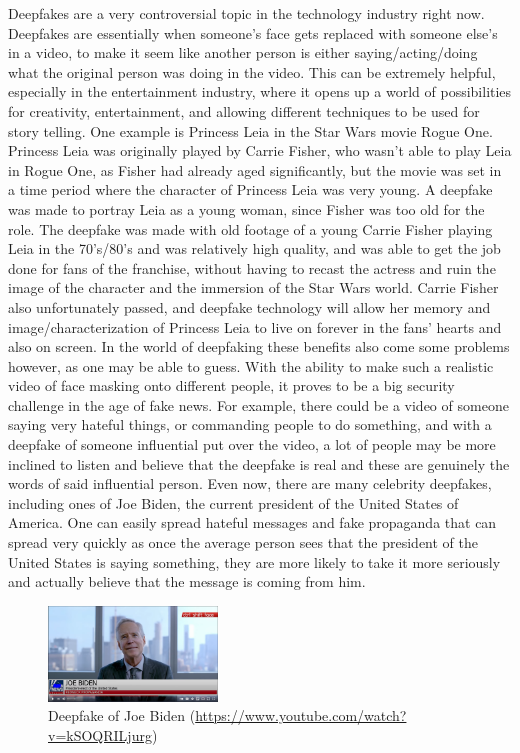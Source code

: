 \documentclass{article}
\begin{document}
Deepfakes are a very controversial topic in the technology industry right now. Deepfakes are essentially when someone’s face gets replaced with someone else’s in a video, to make it seem like another person is either saying/acting/doing what the original person was doing in the video. This can be extremely helpful, especially in the entertainment industry, where it opens up a world of possibilities for creativity, entertainment, and allowing different techniques to be used for story telling. One example is Princess Leia in the Star Wars movie Rogue One. Princess Leia was originally played by Carrie Fisher, who wasn’t able to play Leia in Rogue One, as Fisher had already aged significantly, but the movie was set in a time period where the character of Princess Leia was very young. A deepfake was made to portray Leia as a young woman, since Fisher was too old for the role. The deepfake was made with old footage of a young Carrie Fisher playing Leia in the 70’s/80’s and was relatively high quality, and was able to get the job done for fans of the franchise, without having to recast the actress and ruin the image of the character and the immersion of the Star Wars world. Carrie Fisher also unfortunately passed, and deepfake technology will allow her memory and image/characterization of Princess Leia to live on forever in the fans’ hearts and also on screen. In the world of deepfaking these benefits also come some problems however, as one may be able to guess. With the ability to make such a realistic video of face masking onto different people, it proves to be a big security challenge in the age of fake news. For example, there could be a video of someone saying very hateful things, or commanding people to do something, and with a deepfake of someone influential put over the video, a lot of people may be more inclined to listen and believe that the deepfake is real and these are genuinely the words of said influential person. Even now, there are many celebrity deepfakes, including ones of Joe Biden, the current president of the United States of America. One can easily spread hateful messages and fake propaganda that can spread very quickly as once the average person sees that the president of the United States is saying something, they are more likely to take it more seriously and actually believe that the message is coming from him. 

\begin{figure}[!htbp]
\caption{Deepfake of Joe Biden (\url{https://www.youtube.com/watch?v=kSOQRILjurg})}
\centering
\includegraphics[width=0.4\textwidth]{biden deepfake.png}
\end{figure}
\end{document}
